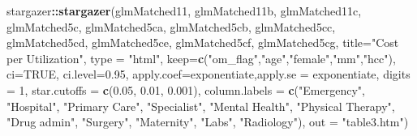 \documentclass[]{article}
\newenvironment{Shaded}{\begin{snugshade}}{\end{snugshade}}
\newcommand{\KeywordTok}[1]{\textcolor[rgb]{0.13,0.29,0.53}{\textbf{#1}}}
\newcommand{\DataTypeTok}[1]{\textcolor[rgb]{0.13,0.29,0.53}{#1}}
\newcommand{\DecValTok}[1]{\textcolor[rgb]{0.00,0.00,0.81}{#1}}
\newcommand{\FloatTok}[1]{\textcolor[rgb]{0.00,0.00,0.81}{#1}}
\newcommand{\StringTok}[1]{\textcolor[rgb]{0.31,0.60,0.02}{#1}}
\newcommand{\OtherTok}[1]{\textcolor[rgb]{0.56,0.35,0.01}{#1}}
\newcommand{\OperatorTok}[1]{\textcolor[rgb]{0.81,0.36,0.00}{\textbf{#1}}}
\newcommand{\NormalTok}[1]{#1}
\begin{document}
\begin{Shaded}
\begin{Highlighting}[]
\NormalTok{stargazer}\OperatorTok{::}\KeywordTok{stargazer}\NormalTok{(glmMatched11, glmMatched11b, glmMatched11c, glmMatched5c, glmMatched5ca, glmMatched5cb,  glmMatched5cc,  glmMatched5cd,  glmMatched5ce,  glmMatched5cf,  glmMatched5cg, }
          \DataTypeTok{title=}\StringTok{"Cost per Utilization"}\NormalTok{, }
          \DataTypeTok{type =} \StringTok{"html"}\NormalTok{,}
          \DataTypeTok{keep=}\KeywordTok{c}\NormalTok{(}\StringTok{"om_flag"}\NormalTok{,}\StringTok{"age"}\NormalTok{,}\StringTok{"female"}\NormalTok{,}\StringTok{"mm"}\NormalTok{,}\StringTok{"hcc"}\NormalTok{),}
          \DataTypeTok{ci=}\OtherTok{TRUE}\NormalTok{, }\DataTypeTok{ci.level=}\FloatTok{0.95}\NormalTok{,}
          \DataTypeTok{apply.coef=}\NormalTok{exponentiate,}\DataTypeTok{apply.se =}\NormalTok{ exponentiate,}
          \DataTypeTok{digits =} \DecValTok{1}\NormalTok{, }
          \DataTypeTok{star.cutoffs =} \KeywordTok{c}\NormalTok{(}\FloatTok{0.05}\NormalTok{, }\FloatTok{0.01}\NormalTok{, }\FloatTok{0.001}\NormalTok{),}
          \DataTypeTok{column.labels =} \KeywordTok{c}\NormalTok{(}\StringTok{"Emergency"}\NormalTok{, }\StringTok{"Hospital"}\NormalTok{, }\StringTok{"Primary Care"}\NormalTok{, }\StringTok{"Specialist"}\NormalTok{, }\StringTok{"Mental Health"}\NormalTok{, }\StringTok{"Physical Therapy"}\NormalTok{, }\StringTok{"Drug admin"}\NormalTok{, }\StringTok{"Surgery"}\NormalTok{, }\StringTok{"Maternity"}\NormalTok{, }\StringTok{"Labs"}\NormalTok{, }\StringTok{"Radiology"}\NormalTok{),}
          \DataTypeTok{out =} \StringTok{"table3.htm"}\NormalTok{)}
\end{Highlighting}
\end{Shaded}
\end{document}
